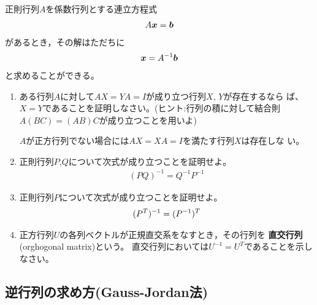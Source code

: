 \documentclass[twocolumn,11pt]{jarticle}
\begin{document}
正則行列$A$を係数行列とする連立方程式
\begin{align}
  A\boldsymbol{x}=\boldsymbol{b}
\end{align}
があるとき，その解はただちに
\begin{align}
  \boldsymbol{x}=A^{-1}\boldsymbol{b}
\end{align}
と求めることができる。
\begin{enumerate}
\item ある行列$A$に対して$AX=YA=I$が成り立つ行列$X$, $Y$が存在するなら
  ば、$X=Y$であることを証明しなさい。(ヒント:行列の積に対して結合則
  $A(BC)=(AB)C$が成り立つことを用いよ)

\comment $A$が正方行列でない場合には$AX=XA=I$を満たす行列$X$は存在しな
い。
\item 正則行列$P$,$Q$について次式が成り立つことを証明せよ。
  \begin{align}
    \label{eq:PQ-1}
    (PQ)^{-1}=Q^{-1}P^{-1}
  \end{align}
\item 正則行列$P$について次式が成り立つことを証明せよ。
  \begin{align}
    (P^T)^{-1}=(P^{-1})^T\notag
  \end{align}
\item 正方行列$U$の各列ベクトルが正規直交系をなすとき，その行列を
  \textbf{直交行列}
  (orghogonal matrix)という。
  直交行列においては$U^{-1}=U^{T}$であることを示しなさい。
\end{enumerate}%

\subsection{逆行列の求め方(Gauss-Jordan法)}
\end{document}
